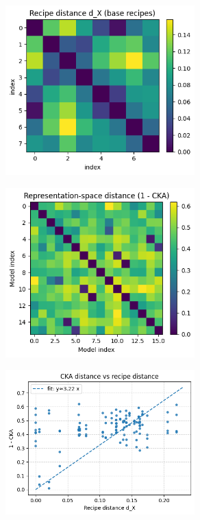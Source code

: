 \documentclass[12pt]{article}
\begin{document}
\begin{figure}[h]
    \centering
    \includegraphics[width=0.65\textwidth]{figures/A5/local continuity/recipe distance base recipes.png}
\end{figure}

\begin{figure}[h]
    \centering
    \includegraphics[width=0.65\textwidth]{figures/A5/local continuity/representation-space distance.png}
\end{figure}

\begin{figure}[h]
    \centering
    \includegraphics[width=0.65\textwidth]{figures/A5/local continuity/cka distance vs recipe distance.png}
\end{figure}
\end{document}
